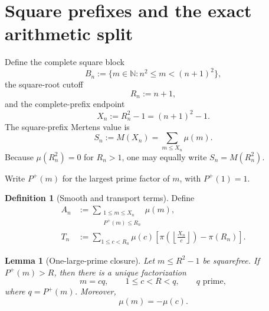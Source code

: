 \documentclass[11pt]{article}
\newtheorem{lemma}[theorem]{Lemma}
\theoremstyle{definition}
\newtheorem{definition}[theorem]{Definition}
\theoremstyle{remark}
\newcommand{\Pplus}{P^{+}}
\newcommand{\1}{\mathbf{1}}
\newcommand{\N}{\mathbb{N}}
\begin{document}
\section{Square prefixes and the exact arithmetic split}
\label{sec:arithmetic}

Define the complete square block
\begin{equation}
 B_n:=\{m\in\N:n^2\le m<(n+1)^2\},
 \label{eq:block}
\end{equation}
the square-root cutoff
\begin{equation}
 R_n:=n+1,
 \label{eq:Rn}
\end{equation}
and the complete-prefix endpoint
\begin{equation}
 X_n:=R_n^2-1=(n+1)^2-1.
 \label{eq:Xn}
\end{equation}
The square-prefix Mertens value is
\begin{equation}
 S_n:=M(X_n)=\sum_{m\le X_n}\mu(m).
 \label{eq:Sn}
\end{equation}
Because $\mu(R_n^2)=0$ for $R_n>1$, one may equally write $S_n=M(R_n^2)$.

Write $\Pplus(m)$ for the largest prime factor of $m$, with $\Pplus(1)=1$.

\begin{definition}[Smooth and transport terms]
\label{def:AT}
Define
\begin{align}
 A_n
 &:={\sum}_{\substack{1\le m\le X_n\\\Pplus(m)\le R_n}}\mu(m),
 \label{eq:An}\\
 T_n
 &:={\sum}_{1\le c<R_n}\mu(c)
 \left[
 \pi\!\left(\left\lfloor\frac{X_n}{c}\right\rfloor\right)-\pi(R_n)
 \right].
 \label{eq:Tn}
\end{align}
\end{definition}

\begin{lemma}[One-large-prime closure]
\label{lem:one-large}
Let $m\le R^2-1$ be squarefree.  If $\Pplus(m)>R$, then there is a unique factorization
\begin{equation}
 m=cq,
 \qquad
 1\le c<R<q,
 \qquad
 q\text{ prime},
 \label{eq:one-large}
\end{equation}
where $q=\Pplus(m)$.  Moreover,
\begin{equation}
 \mu(m)=-\mu(c).
 \label{eq:mobius-peel}
\end{equation}
\end{lemma}
\end{document}
